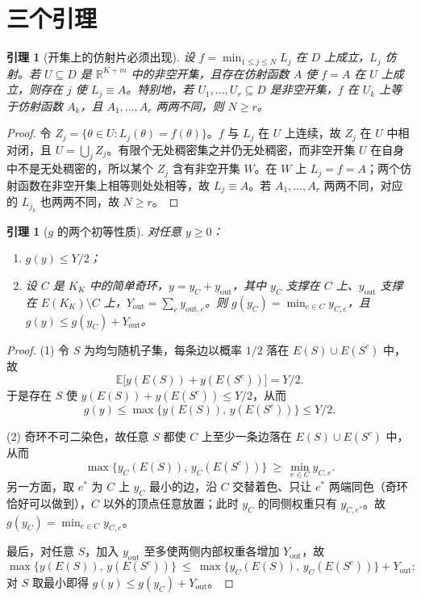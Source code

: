\documentclass[11pt,a4paper]{article}
\newtheorem{lemma}[theorem]{引理}
\theoremstyle{definition}
\begin{document}
\section{三个引理}

\begin{lemma}[开集上的仿射片必须出现]\label{lem:piece}
设 $f=\min_{1\le j\le N}L_j$ 在 $D$ 上成立，$L_j$ 仿射。若 $U\subseteq D$ 是 $\mathbb R^{K+m}$ 中的非空开集，且存在仿射函数 $A$ 使 $f=A$ 在 $U$ 上成立，则存在 $j$ 使 $L_j\equiv A$。特别地，若 $U_1,\dots,U_r\subseteq D$ 是非空开集，$f$ 在 $U_k$ 上等于仿射函数 $A_k$，且 $A_1,\dots,A_r$ 两两不同，则 $N\ge r$。
\end{lemma}
\begin{proof}
令 $Z_j=\{\theta\in U:L_j(\theta)=f(\theta)\}$。$f$ 与 $L_j$ 在 $U$ 上连续，故 $Z_j$ 在 $U$ 中相对闭，且 $U=\bigcup_jZ_j$。有限个无处稠密集之并仍无处稠密，而非空开集 $U$ 在自身中不是无处稠密的，所以某个 $Z_j$ 含有非空开集 $W$。在 $W$ 上 $L_j=f=A$；两个仿射函数在非空开集上相等则处处相等，故 $L_j\equiv A$。若 $A_1,\dots,A_r$ 两两不同，对应的 $L_{j_k}$ 也两两不同，故 $N\ge r$。
\end{proof}

\begin{lemma}[$g$ 的两个初等性质]\label{lem:g}
对任意 $y\ge0$：
\begin{enumerate}
\item $g(y)\le Y/2$；
\item 设 $C$ 是 $K_K$ 中的简单奇环，$y=y_C+y_{\mathrm{out}}$，其中 $y_C$ 支撑在 $C$ 上、$y_{\mathrm{out}}$ 支撑在 $E(K_K)\setminus C$ 上，$Y_{\mathrm{out}}=\sum_ey_{\mathrm{out},e}$。则 $g(y_C)=\min_{e\in C}y_{C,e}$，且 $g(y)\le g(y_C)+Y_{\mathrm{out}}$。
\end{enumerate}
\end{lemma}
\begin{proof}
(1) 令 $S$ 为均匀随机子集，每条边以概率 $1/2$ 落在 $E(S)\cup E(S^c)$ 中，故
\[
\mathbb E\bigl[y(E(S))+y(E(S^c))\bigr]=Y/2 .
\]
于是存在 $S$ 使 $y(E(S))+y(E(S^c))\le Y/2$，从而
\[
g(y)\le\max\{y(E(S)),\,y(E(S^c))\}\le Y/2 .
\]

(2) 奇环不可二染色，故任意 $S$ 都使 $C$ 上至少一条边落在 $E(S)\cup E(S^c)$ 中，从而
\[
\max\{y_C(E(S)),\,y_C(E(S^c))\}\ \ge\ \min_{e\in C}y_{C,e}.
\]
另一方面，取 $e^*$ 为 $C$ 上 $y_C$ 最小的边，沿 $C$ 交替着色、只让 $e^*$ 两端同色（奇环恰好可以做到），$C$ 以外的顶点任意放置；此时 $y_C$ 的同侧权重只有 $y_{C,e^*}$。故 $g(y_C)=\min_{e\in C}y_{C,e}$。

最后，对任意 $S$，加入 $y_{\mathrm{out}}$ 至多使两侧内部权重各增加 $Y_{\mathrm{out}}$，故
\[
\max\{y(E(S)),\,y(E(S^c))\}\ \le\ \max\{y_C(E(S)),\,y_C(E(S^c))\}+Y_{\mathrm{out}} ;
\]
对 $S$ 取最小即得 $g(y)\le g(y_C)+Y_{\mathrm{out}}$。
\end{proof}
\end{document}
